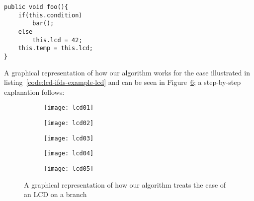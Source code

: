 \begin{lstlisting}[caption={Code after which the graph in the example of an LCD
is made}, label={code:lcd-ifds-example-lcd}]
public void foo(){
	if(this.condition)
		bar();
	else
		this.lcd = 42;
	this.temp = this.lcd;
}
\end{lstlisting}

A graphical representation of how our algorithm works for the case illustrated
in listing~\ref{code:lcd-ifds-example-lcd} and can be seen in
Figure~\ref{fig:lcd-lcd}; a step-by-step explanation follows:

\begin{figure}
        \begin{subfigure}[h]{0.3\textwidth}
                \centering
                \texttt{[image: lcd01]}
                \caption{}
                \label{fig:lcd-lcd01}
        \end{subfigure}%
        \begin{subfigure}[h]{0.3\textwidth}
                \centering
                \texttt{[image: lcd02]}
                \caption{}
                \label{fig:lcd-lcd02}
        \end{subfigure}
        \begin{subfigure}[h]{0.3\textwidth}
                \centering
                \texttt{[image: lcd03]}
                \caption{}
                \label{fig:lcd-lcd03}
        \end{subfigure}
        
        \begin{subfigure}[h]{0.3\textwidth}
                \centering
                \texttt{[image: lcd04]}
                \caption{}
                \label{fig:lcd-lcd04}
        \end{subfigure}
        \begin{subfigure}[h]{0.3\textwidth}
                \centering
                \texttt{[image: lcd05]}
                \caption{}
                \label{fig:lcd-lcd05}
        \end{subfigure}
        \caption{A graphical representation of how our
        algorithm treats the case of an LCD on a branch}\label{fig:lcd-lcd}
\end{figure}

